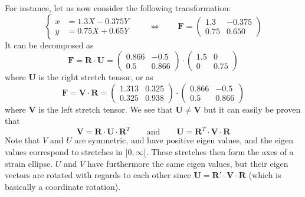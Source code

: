 For instance, let us now consider the following transformation:
\begin{equation}
\begin{cases} 
x &= 1.3X-0.375Y\\ 
y &= 0.75X+0.65 Y
\end{cases}
\qquad
\Leftrightarrow
\qquad
{\bm F} = 
\left(
\begin{array}{cc}
1.3 & -0.375 \\
0.75 & 0.650
\end{array}
\right)
\end{equation}
It can be decomposed as 
\[
{\bm F} = {\bm R} \cdot {\bm U}
=
\left(
\begin{array}{cc}
0.866 & -0.5 \\
0.5 & 0.866
\end{array}
\right)
\cdot
\left(
\begin{array}{cc}
1.5 & 0 \\
0 & 0.75
\end{array}
\right)
\]
where ${\bm U}$ is the right stretch tensor, or as  
\[
{\bm F} = {\bm V} \cdot {\bm R}
=
\left(
\begin{array}{cc}
1.313 & 0.325 \\
0.325 & 0.938 
\end{array}
\right)
\cdot
\left(
\begin{array}{cc}
0.866 & -0.5 \\
0.5 & 0.866
\end{array}
\right)
\]
where ${\bm V}$ is the left stretch tensor.  
We see that ${\bm U}\ne {\bm V}$ but it can 
easily be proven that 
\[
{\bm V} = {\bm R}\cdot{\bm U}\cdot {\bm R}^T
\qquad
\text{and}
\qquad
{\bm U} = {\bm R}^T\cdot{\bm V}\cdot {\bm R}
\]
Note that  $V$ and $U$ are symmetric, and have positive eigen values, and the 
eigen values correspond to stretches in $[0,\infty[$.
These stretches then form the axes of a strain ellipse. 
$U$ and $V$ have furthermore the same eigen values, but their eigen vectors are 
rotated with regards to each other since ${\bm U} = {\bm R}’ \cdot {\bm V} \cdot {\bm R}$ (which is basically a coordinate rotation).



